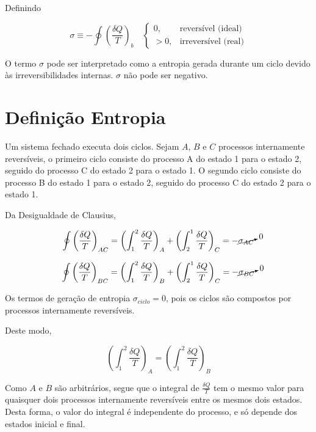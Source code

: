 Definindo

\begin{equation}
    \sigma \equiv - \oint \left( \frac{\delta Q}{T} \right)_b \quad
    \begin{cases}
        0, & \text{reversível (ideal)} \\
        > 0, & \text{irreversível (real)}
    \end{cases}
\end{equation}

O termo $\sigma$ pode ser interpretado como a entropia gerada durante um ciclo devido às irreversibilidades internas. $\sigma$ não pode ser negativo.  


\section{Definição Entropia}

Um sistema fechado executa dois ciclos. Sejam $A$, $B$ e $C$ processos internamente reversíveis, o primeiro ciclo consiste do processo A do estado 1 para o estado 2, seguido do processo C do estado 2 para o estado 1. O segundo ciclo consiste do processo B do estado 1 para o estado 2, seguido do processo C do estado 2 para o estado 1.

Da Desigualdade de Clausius,

\begin{equation*}
    \oint \left( \frac{\delta Q}{T} \right)_{AC}  = \left( \int_1^2 \frac{\delta Q}{T} \right)_A + \left( \int_2^1 \frac{\delta Q}{T} \right)_C = - \cancelto{0}{\sigma_{AC}}
\end{equation*}

\begin{equation*}
    \oint \left( \frac{\delta Q}{T} \right)_{BC}  = \left( \int_1^2 \frac{\delta Q}{T} \right)_B + \left( \int_2^1 \frac{\delta Q}{T} \right)_C = - \cancelto{0}{\sigma_{BC}}
\end{equation*}

Os termos de geração de entropia $\sigma_{ciclo} = 0$, pois os ciclos são compostos por processos internamente reversíveis.

Deste modo,

\begin{equation*}
    \left( \int_1^2 \frac{\delta Q}{T} \right)_A = \left( \int_1^2 \frac{\delta Q}{T} \right)_B
\end{equation*}

Como $A$ e $B$ são arbitrários, segue que o integral de $\frac{\delta Q}{T}$ tem o mesmo valor para quaisquer dois processos internamente reversíveis entre os mesmos dois estados. Desta forma, o valor do integral é independente do processo, e só depende dos estados inicial e final.

